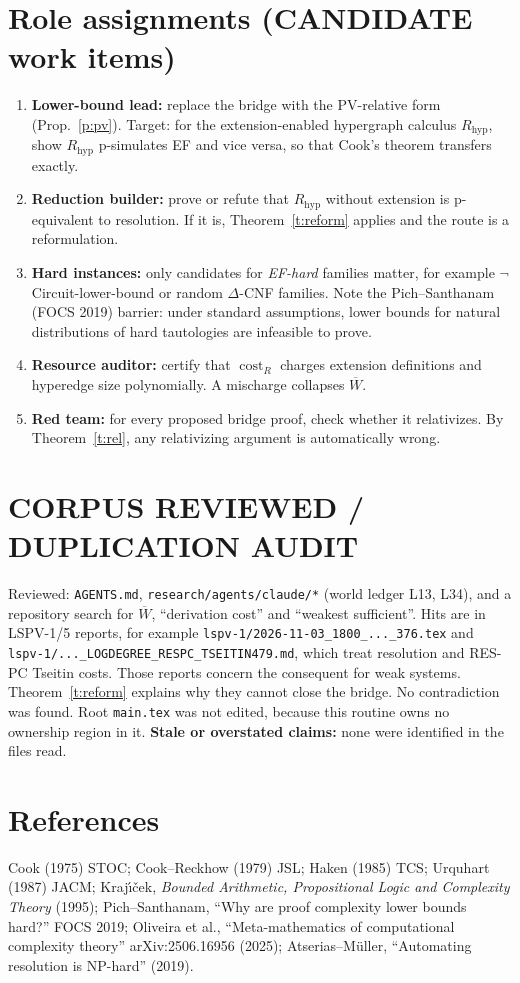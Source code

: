 \documentclass[11pt]{article}
\theoremstyle{remark}\newtheorem{remark}[theorem]{Remark}
\begin{document}
\section{Role assignments (CANDIDATE work items)}
\begin{enumerate}
\item \textbf{Lower-bound lead:} replace the bridge with the PV-relative form (Prop.~\ref{p:pv}). Target:
for the extension-enabled hypergraph calculus $R_{\mathrm{hyp}}$, show $R_{\mathrm{hyp}}$ p-simulates EF and
vice versa, so that Cook's theorem transfers exactly.
\item \textbf{Reduction builder:} prove or refute that $R_{\mathrm{hyp}}$ without extension is p-equivalent to
resolution. If it is, Theorem~\ref{t:reform} applies and the route is a reformulation.
\item \textbf{Hard instances:} only candidates for \emph{EF-hard} families matter, for example
$\neg$Circuit-lower-bound or random $\Delta$-CNF families. Note the Pich--Santhanam (FOCS 2019) barrier:
under standard assumptions, lower bounds for natural distributions of hard tautologies are infeasible to
prove.
\item \textbf{Resource auditor:} certify that $\operatorname{cost}_R$ charges extension definitions and
hyperedge size polynomially. A mischarge collapses $\overline W$.
\item \textbf{Red team:} for every proposed bridge proof, check whether it relativizes. By
Theorem~\ref{t:rel}, any relativizing argument is automatically wrong.
\end{enumerate}

\section*{CORPUS REVIEWED / DUPLICATION AUDIT}
Reviewed: \texttt{AGENTS.md}, \texttt{research/agents/claude/*} (world ledger L13, L34), and a repository
search for $\overline W$, ``derivation cost'' and ``weakest sufficient''. Hits are in LSPV-1/5 reports, for
example \texttt{lspv-1/2026-11-03\_1800\_..._376.tex} and \texttt{lspv-1/..._LOGDEGREE\_RESPC\_TSEITIN479.md},
which treat resolution and RES-PC Tseitin costs. Those reports concern the consequent for weak systems.
Theorem~\ref{t:reform} explains why they cannot close the bridge. No contradiction was found. Root
\texttt{main.tex} was not edited, because this routine owns no ownership region in it. \textbf{Stale or
overstated claims:} none were identified in the files read.

\section*{References}
Cook (1975) STOC; Cook--Reckhow (1979) JSL; Haken (1985) TCS; Urquhart (1987) JACM;
Kraj\'{\i}\v{c}ek, \emph{Bounded Arithmetic, Propositional Logic and Complexity Theory} (1995);
Pich--Santhanam, ``Why are proof complexity lower bounds hard?'' FOCS 2019;
Oliveira et al., ``Meta-mathematics of computational complexity theory'' arXiv:2506.16956 (2025);
Atserias--M\"uller, ``Automating resolution is NP-hard'' (2019).
\end{document}

